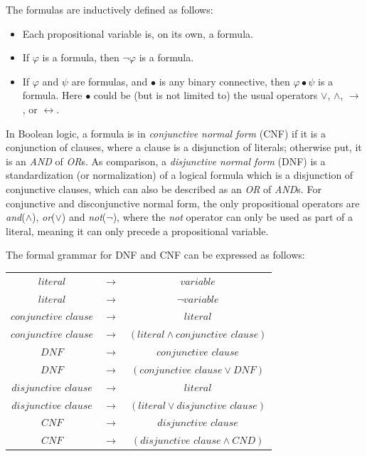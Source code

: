 The formulas are inductively defined as follows:
\begin{itemize}
\item Each propositional variable is, on its own, a formula.
\item If $\varphi$ is a formula, then $\neg \varphi$ is a formula.
\item If $\varphi$ and $\psi$ are formulas, and $\bullet$ is any binary connective, then $\varphi \bullet \psi$ is a formula. Here $\bullet$ could be (but is not limited to) the usual operators $\vee$, $\wedge$, $\to$, or $\leftrightarrow$.
\end{itemize}

In Boolean logic, a formula is in \textit{conjunctive normal form} (CNF) if it is a conjunction of clauses, where a clause is a disjunction of literals; otherwise put, it is an \textit{AND} of \textit{OR}s.
As comparison, a \textit{disjunctive normal form} (DNF) is a standardization (or normalization) of a logical formula which is a disjunction of conjunctive clauses, which can also be described as an \textit{OR} of \textit{AND}s.
For conjunctive and disconjunctive normal form, the only propositional operators are \textit{and}($\wedge$), \textit{or}($\vee$) and \textit{not}($\neg$), where the \textit{not} operator can only be used as part of a literal, meaning it can only precede a propositional variable.

The formal grammar for DNF and CNF can be expressed as follows:

\begin{tabular}{ccc}
$\textit{literal}$ & $\to$ & $\textit{variable}$ \\
$\textit{literal}$ & $\to$ & $\neg \textit{variable}$ \\
$\textit{conjunctive clause}$ & $\to$ & $\textit{literal}$ \\
$\textit{conjunctive clause}$ & $\to$ & $(\textit{literal} \wedge \textit{conjunctive clause})$ \\
$\textit{DNF}$ & $\to$ & $\textit{conjunctive clause}$ \\
$\textit{DNF}$ & $\to$ & $(\textit{conjunctive clause} \vee \textit{DNF})$ \\
$\textit{disjunctive clause}$ & $\to$ & $\textit{literal}$ \\
$\textit{disjunctive clause}$ & $\to$ & $(\textit{literal} \vee \textit{disjunctive clause})$ \\
$\textit{CNF}$ & $\to$ & $\textit{disjunctive clause}$ \\
$\textit{CNF}$ & $\to$ & $(\textit{disjunctive clause} \wedge \textit{CND})$
\end{tabular}

